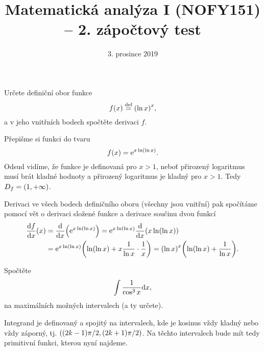 \documentclass[answers]{exam}
\title{\vspace{-3ex}Matematická analýza I (NOFY151) – 2. zápočtový test\vspace{-1ex}}
\author{\vspace{-2ex}}
\date{\vspace{-2ex}3. prosince 2019}
\begin{document}
\maketitle

\begin{questions}
  \question[2] Určete definiční obor funkce
  \begin{equation*}
    f(x) \defeq \parens{\ln x}^x,
  \end{equation*}
  a v jeho vnitřních bodech spočtěte derivaci $f$.
  
  \begin{solution}
    Přepišme si funkci do tvaru
    \begin{equation*}
      f(x) = \exponential{x \ln \parens{\ln x}}.
    \end{equation*}
    Odsud vidíme, že funkce je definovaná pro $x > 1$, neboť  přirozený logaritmus musí brát kladné hodnoty a  přirozený logaritmus je kladný pro $x > 1$. Tedy $D_f = \parens{1, +\infty}$.
    
    Derivaci ve všech bodech definičního oboru (všechny jsou vnitřní) pak spočítáme pomocí vět o derivaci složené funkce a derivace součinu dvou funkcí
    \begin{align*}
      \dd{f}{x}(x) 
      &= 
      \dd{}{x} \parens{\exponential{x \ln \parens{\ln x}}} 
      =
      \exponential{x \ln \parens{\ln x}} \dd{}{x} \parens{x \ln \parens{\ln x}}
      \\
      &=
      \exponential{x \ln \parens{\ln x}} \parens{\ln \parens{\ln x} + x \frac{1}{\ln x} \cdot \frac{1}{x}}
      =
      \parens{\ln x}^x \parens{\ln \parens{\ln x} + \frac{1}{\ln x}}.
    \end{align*}
  \end{solution}
  
  \question[4] Spočtěte
  \begin{equation*}
    \int \frac{1}{\cos^3 x} \mathrm{d} x,
  \end{equation*}
  na maximálních možných intervalech (a ty určete).
  
  \begin{solution}
    Integrand je definovaný a spojitý na intervalech, kde je kosinus vždy kladný nebo vždy záporný, tj. $\parens{(2k - 1)\pi/2, (2k + 1)\pi/2}$. Na těchto intervalech bude mít tedy primitivní funkci, kterou nyní najdeme. 
    

\end{solution}
\end{questions}
\end{document}
